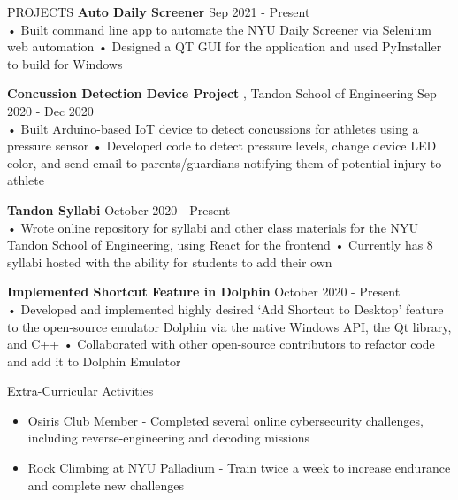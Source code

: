 \documentclass{resume} %
\begin{document}
\begin{rSection}{PROJECTS}
\textbf{\bf Auto Daily Screener } \hfill Sep 2021 - Present \\%
• Built command line app to automate the NYU Daily Screener via Selenium web automation
\newline
• Designed a QT GUI for the application and used PyInstaller to build for Windows

\textbf{\bf Concussion Detection Device Project }, Tandon School of Engineering \hfill Sep 2020 - Dec 2020 \\%
• Built Arduino-based IoT device to detect concussions for athletes using a pressure sensor
\newline
• Developed code to detect pressure levels, change device LED color, and send email to parents/guardians notifying them of potential injury to athlete

\textbf{\bf Tandon Syllabi } \hfill October 2020 - Present \\%
• Wrote online repository for syllabi and other class materials for the NYU Tandon School of Engineering, using React for the frontend
\newline
• Currently has 8 syllabi hosted with the ability for students to add their own 

\textbf{\bf Implemented Shortcut Feature in Dolphin } \hfill October 2020 - Present \\%
• Developed and implemented highly desired ‘Add Shortcut to Desktop’ feature to the open-source emulator Dolphin via the native Windows API, the Qt library, and C++
\newline
• Collaborated with other open-source contributors to refactor code and add it to Dolphin Emulator


\end{rSection} 

\begin{rSection}{Extra-Curricular Activities} 
\begin{itemize} %
    \item 	Osiris Club Member - Completed several online cybersecurity challenges, including reverse-engineering and decoding missions
    \item	Rock Climbing at NYU Palladium - Train twice a week to increase endurance and complete new challenges
\end{itemize}


\end{rSection}
\end{document}
